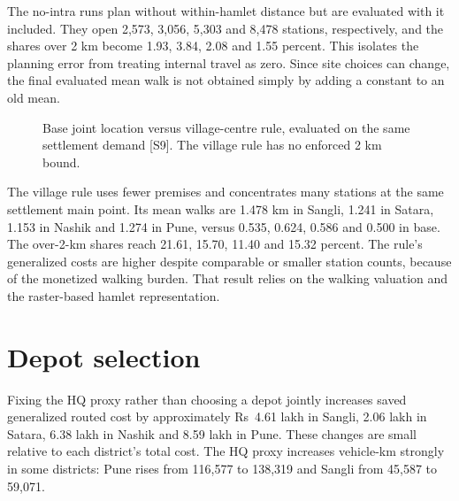 \documentclass[11pt,a4paper,oneside]{report}
\newcommand{\source}[1]{\par\nopagebreak[4]{\footnotesize\color{teal}Evidence: #1.}\par}
\begin{document}
The no-intra runs plan without within-hamlet distance but are evaluated with it included. They open 2,573, 3,056, 5,303 and 8,478 stations, respectively, and the shares over 2 km become 1.93, 3.84, 2.08 and 1.55 percent. This isolates the planning error from treating internal travel as zero. Since site choices can change, the final evaluated mean walk is not obtained simply by adding a constant to an old mean.
\begin{figure}[htbp]\centering
{}
\caption{Base joint location versus village-centre rule, evaluated on the same settlement demand [S9]. The village rule has no enforced 2 km bound.}\end{figure}
The village rule uses fewer premises and concentrates many stations at the same settlement main point. Its mean walks are 1.478 km in Sangli, 1.241 in Satara, 1.153 in Nashik and 1.274 in Pune, versus 0.535, 0.624, 0.586 and 0.500 in base. The over-2-km shares reach 21.61, 15.70, 11.40 and 15.32 percent. The rule's generalized costs are higher despite comparable or smaller station counts, because of the monetized walking burden. That result relies on the walking valuation and the raster-based hamlet representation.
\source{[S8], [S9]}

\section{Depot selection}
Fixing the HQ proxy rather than choosing a depot jointly increases saved generalized routed cost by approximately Rs~4.61 lakh in Sangli, 2.06 lakh in Satara, 6.38 lakh in Nashik and 8.59 lakh in Pune. These changes are small relative to each district's total cost. The HQ proxy increases vehicle-km strongly in some districts: Pune rises from 116,577 to 138,319 and Sangli from 45,587 to 59,071.
\end{document}
